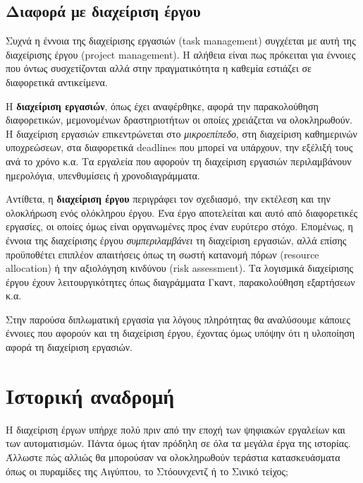         \subsection{Διαφορά με διαχείριση έργου}
            Συχνά η έννοια της διαχείρισης εργασιών (task management) συγχέεται με αυτή της διαχείρισης έργου (project management). Η αλήθεια είναι πως πρόκειται για έννοιες που όντως συσχετίζονται αλλά στην πραγματικότητα η καθεμία εστιάζει σε διαφορετικά αντικείμενα.

            Η \textbf{διαχείριση εργασιών}, όπως έχει αναφέρθηκε, αφορά την παρακολούθηση διαφορετικών, μεμονομένων δραστηριοτήτων οι οποίες χρειάζεται να ολοκληρωθούν. Η διαχείριση εργασιών επικεντρώνεται στο \textit{μικροεπίπεδο}, στη διαχείριση καθημερινών υποχρεώσεων, στα διαφορετικά deadlines που μπορεί να υπάρχουν, την εξέλιξή τους ανά το χρόνο κ.α. Τα εργαλεία που αφορούν τη διαχείριση εργασιών περιλαμβάνουν ημερολόγια, υπενθυμίσεις ή χρονοδιαγράμματα.

            Αντίθετα, η \textbf{διαχείριση έργου} περιγράφει τον σχεδιασμό, την εκτέλεση και την ολοκλήρωση ενός ολόκληρου έργου. Ένα έργο αποτελείται και αυτό από διαφορετικές εργασίες, οι οποίες όμως είναι οργανωμένες προς έναν ευρύτερο στόχο. Επομένως, η έννοια της διαχείρισης έργου \textit{συμπεριλαμβάνει} τη διαχείριση εργασιών, αλλά επίσης προϋποθέτει επιπλέον απαιτήσεις όπως τη σωστή κατανομή πόρων (resource allocation) ή την αξιολόγηση κινδύνου (risk assessment). Τα λογισμικά διαχείρισης έργου έχουν λειτουργικότητες όπως διαγράμματα Γκαντ, παρακολούθηση εξαρτήσεων κ.α.

            Στην παρούσα διπλωματική εργασία για λόγους πληρότητας θα αναλύσουμε κάποιες έννοιες που αφορούν και τη διαχείριση έργου, έχοντας όμως υπόψην ότι η υλοποίηση αφορά τη διαχείριση εργασιών.


    \section{Ιστορική αναδρομή}
        Η διαχείριση έργων υπήρχε πολύ πριν από την εποχή των ψηφιακών εργαλείων και των αυτοματισμών. Πάντα όμως ήταν πρόδηλη σε όλα τα μεγάλα έργα της ιστορίας. Άλλωστε πώς αλλιώς θα μπορούσαν να ολοκληρωθούν τεράστια κατασκευάσματα όπως οι πυραμίδες της Αιγύπτου, το Στόουνχεντζ ή το Σινικό τείχος;

